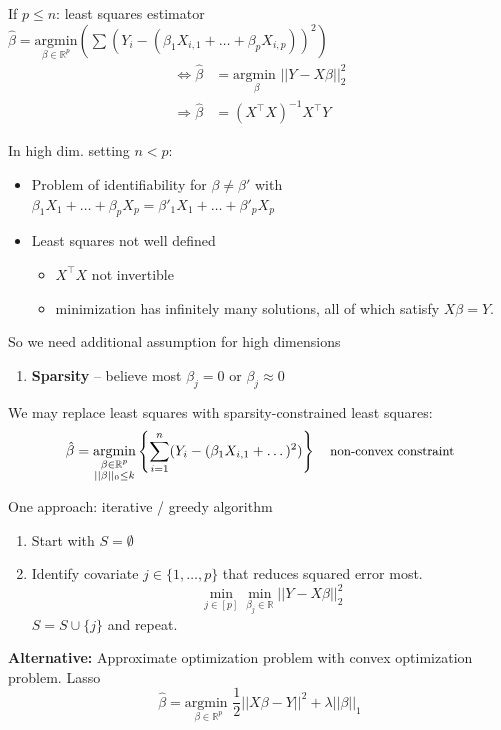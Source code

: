 If $p \le n$: least squares estimator $\hat{\beta} = \underset{\beta \in \mathbb{R}^p}{\text{argmin}} \left( \sum (Y_i - (\beta_1 X_{i,1} + \dots + \beta_p X_{i,p}))^2 \right)$
\begin{align*}
    \Leftrightarrow \hat{\beta} &= \underset{\beta}{\text{argmin }} ||Y - X\beta||_2^2 \\
    \Rightarrow \hat{\beta} &= (X^\top X)^{-1} X^\top Y
\end{align*}

In high dim. setting $n < p$:
\begin{itemize}
    \item Problem of identifiability for $\beta \neq \beta'$ with $\beta_1 X_1 + \dots + \beta_p X_p = \beta'_1 X_1 + \dots + \beta'_p X_p$
    \item Least squares not well defined
    \begin{itemize}
        \item[$\hookrightarrow$] $X^\top X$ not invertible
        \item[$\hookrightarrow$] minimization has infinitely many solutions, all of which satisfy $X\beta = Y$.
    \end{itemize}
\end{itemize}

So we need additional assumption for high dimensions
\begin{enumerate}
    \item \textbf{Sparsity} -- believe most $\beta_j = 0$ or $\beta_j \approx 0$
\end{enumerate}

We may replace least squares with sparsity-constrained least squares:
\[
\hat{\beta} = \underset{\substack{\beta \in \mathbb{R}^p \\ ||\beta||_0 \le k}}{\text{argmin}} \left\{ \sum_{i=1}^n (Y_i - (\beta_1 X_{i,1} + \dots)^2) \right\} \quad \text{\small non-convex constraint}
\]


One approach: iterative / greedy algorithm
\begin{enumerate}
    \item Start with $S = \emptyset$
    \item Identify covariate $j \in \{1, \dots, p\}$ that reduces squared error most.
    \[ \min_{j \in [p]} \min_{\beta_j \in \mathbb{R}} ||Y - X\beta||_2^2 \]
    $S = S \cup \{j\}$ and repeat.
\end{enumerate}

\textbf{Alternative:} Approximate optimization problem with convex optimization problem. Lasso
\[ \hat{\beta} = \underset{\beta \in \mathbb{R}^p}{\text{argmin }} \frac{1}{2} ||X\beta - Y||^2 + \lambda ||\beta||_1 \]



